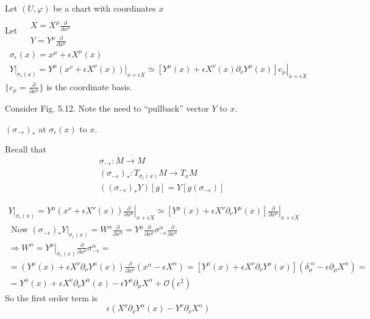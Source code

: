 \documentclass[twoside]{amsart}
\begin{document}
Let $(U, \varphi)$ be a chart with coordinates $x$ \\
Let $ \begin{aligned} & \quad \\ 
  & X = X^{\mu} \frac{ \partial }{ \partial x^{\mu } } \\
  & Y = Y^{\mu} \frac{ \partial }{ \partial x^{\mu} } \end{aligned}$   
\[
\begin{gathered}
  \sigma_{ \epsilon}(x) = x^{\mu} +  \epsilon X^{\mu}(x) \\ 
  \left. Y \right|_{ \sigma_{\epsilon }(x) } = \left. Y^{\mu}(x^{\nu} + \epsilon X^{\nu}(x)) \right|_{x + \epsilon X} \simeq \left. \left[ Y^{\mu}(x) + \epsilon X^{\nu}(x) \partial_{\nu} Y^{\mu }(x) \right] e_{\mu} \right|_{x + \epsilon X}
\end{gathered}
\]
$\lbrace e_{\mu} = \frac{ \partial }{ \partial x^{\mu} } \rbrace$ is the coordinate basis.  

Consider Fig. 5.12.  Note the need to ``pullback'' vector $Y$ to $x$.  


$(\sigma_{-\epsilon})_*$ at $\sigma_{\epsilon}(x)$ to $x$.  

Recall that 
\[
\begin{aligned}
  & \sigma_{-\epsilon} : M \to M \\ 
  & (\sigma_{- \epsilon})_* : T_{ \sigma_{\epsilon}(x) } M \to T_x M \\ 
  & ((\sigma_{-\epsilon})_* Y)[g] = Y[g(\sigma_{-\epsilon }) ] 
\end{aligned}
\]

\[
\begin{gathered}
  \left. Y \right|_{ \sigma_{\epsilon}(x) } = \left. Y^{\mu} (x^{\nu} + \epsilon X^{\nu}(x) ) \frac{ \partial }{ \partial x^{\mu} } \right|_{x + \epsilon X} \simeq \left. \left[ Y^{\mu}(x) + \epsilon X^{\nu} \partial_{\nu} Y^{\mu}(x) \right] \frac{ \partial }{ \partial x^{\mu} } \right|_{x + \epsilon X } \\ 
    \text{ Now } \left. (\sigma_{-\epsilon})_* Y \right|_{ \sigma_{\epsilon}(x) } = W^{\alpha} \frac{ \partial }{ \partial x^{\alpha }} = Y^{\mu} \frac{ \partial }{ \partial x^{\mu}} \sigma_{-\epsilon}^{\alpha} \frac{ \partial }{ \partial x^{\alpha }} \\
    \Longrightarrow W^{\alpha} =\left.  Y^{\mu}  \right|_{ \sigma_{\epsilon}(x) } \frac{ \partial }{ \partial x^{\mu }} \sigma^{\alpha}_{-\epsilon } = \\
    = (Y^{\mu}(x) + \epsilon X^{\nu} \partial_{\nu} Y^{\mu}(x)) \frac{ \partial }{ \partial x^{\mu} } (x^{\alpha}  - \epsilon X^{\alpha} ) = [ Y^{\mu}(x) + \epsilon X^{\nu} \partial_{\nu} Y^{\mu}(x)] ( \delta_{\mu}^{ \, \, \alpha} - \epsilon \partial_{\mu} X^{\alpha} ) = \\
    = Y^{\alpha}(x) + \epsilon X^{\nu} \partial_{\nu} Y^{\alpha}(x) - \epsilon Y^{\mu} \partial_{\mu} X^{\alpha} + \mathcal{O}(\epsilon^2 ) 
\end{gathered} 
\]
So the first order term is 
\[
\epsilon (X^{\nu} \partial_{\nu} Y^{ \alpha}(x) - Y^{\nu} \partial_{\nu} X^{\alpha} )
\]
\end{document}
